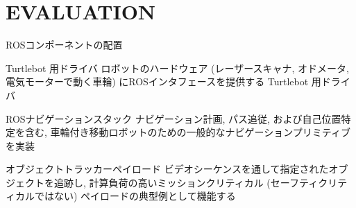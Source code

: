 
\section{EVALUATION}
\label{sec: evaluation}




\begin{frame}{ROSコンポーネントの配置}
    \begin{block}{Turtlebot 用ドライバ}
        ロボットのハードウェア (レーザースキャナ, オドメータ, 電気モーターで動く車輪) にROSインタフェースを提供する Turtlebot 用ドライバ
    \end{block}
    \begin{block}{ROSナビゲーションスタック}
        ナビゲーション計画, パス追従, および自己位置特定を含む, 車輪付き移動ロボットのための一般的なナビゲーションプリミティブを実装
    \end{block}
    \begin{block}{オブジェクトトラッカーペイロード}
        ビデオシーケンスを通して指定されたオブジェクトを追跡し, 計算負荷の高いミッションクリティカル (セーフティクリティカルではない) ペイロードの典型例として機能する
    \end{block}
\end{frame}


